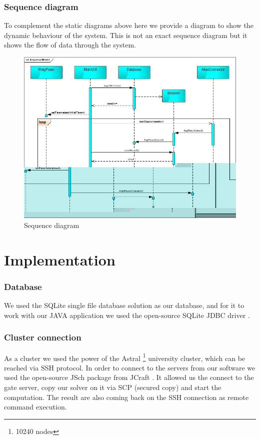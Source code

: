 \documentclass[10pt,a4paper]{report}
\begin{document}
\subsection{Sequence diagram}
To complement the static diagrams above here we provide a diagram to show the dynamic behaviour of the system. This is not an exact sequence diagram but it shows the flow of data through the system.
\begin{figure}[h!]
\includegraphics[width=\textwidth]{SequenceModel.jpg}
\caption{Sequence diagram}
\end{figure}

\chapter{Implementation}
\subsection{Database}
We used the SQLite single file database solution as our database, and for it to work with our JAVA application we used the open-source SQLite JDBC driver \cite{WWW:SQLite}.

\subsection{Cluster connection}
As a cluster we used the power of the Astral \footnote{10240 nodes} university cluster, which can be reached via SSH protocol. In order to connect to the servers from our software we used the open-source JSch package from JCraft \cite{WWW:JSCH}. It allowed us the connect to the gate server, copy our solver on it via SCP (secured copy) and start the computation. The result are also coming back on the SSH connection as remote command execution.
\end{document}
